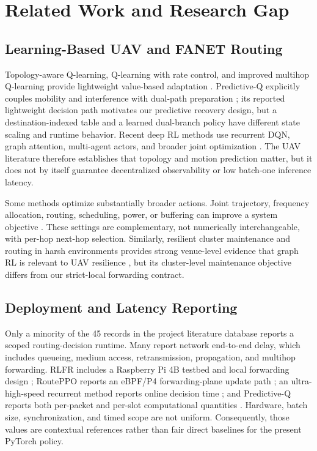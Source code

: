 \documentclass{ieeeaccess}
\begin{document}
\section{Related Work and Research Gap}

\subsection{Learning-Based UAV and FANET Routing}

Topology-aware Q-learning, Q-learning with rate control, and improved multihop Q-learning provide lightweight value-based adaptation \cite{cui2022tarraq,tho2025qlr,sharvari2025improved}. Predictive-Q explicitly couples mobility and interference with dual-path preparation \cite{dong2026predictive}; its reported lightweight decision path motivates our predictive recovery design, but a destination-indexed table and a learned dual-branch policy have different state scaling and runtime behavior. Recent deep RL methods use recurrent DQN, graph attention, multi-agent actors, and broader joint optimization \cite{shou2026adaptive,zhang2025gat,ke2024distributed,wang2025graph}. The UAV literature therefore establishes that topology and motion prediction matter, but it does not by itself guarantee decentralized observability or low batch-one inference latency.

Some methods optimize substantially broader actions. Joint trajectory, frequency allocation, routing, scheduling, power, or buffering can improve a system objective \cite{alam2024joint,wu2026aoi,wang2025graph,zheng2026dual}. These settings are complementary, not numerically interchangeable, with per-hop next-hop selection. Similarly, resilient cluster maintenance and routing in harsh environments provides strong venue-level evidence that graph RL is relevant to UAV resilience \cite{sun2026harsh}, but its cluster-level maintenance objective differs from our strict-local forwarding contract.

\subsection{Deployment and Latency Reporting}

Only a minority of the 45 records in the project literature database reports a scoped routing-decision runtime. Many report network end-to-end delay, which includes queueing, medium access, retransmission, propagation, and multihop forwarding. RLFR includes a Raspberry Pi 4B testbed and local forwarding design \cite{li2024rlfr}; RoutePPO reports an eBPF/P4 forwarding-plane update path \cite{curmen2026routeppo}; an ultra-high-speed recurrent method reports online decision time \cite{shou2026adaptive}; and Predictive-Q reports both per-packet and per-slot computational quantities \cite{dong2026predictive}. Hardware, batch size, synchronization, and timed scope are not uniform. Consequently, those values are contextual references rather than fair direct baselines for the present PyTorch policy.
\end{document}
